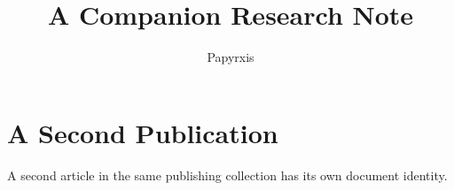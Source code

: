 \documentclass[11pt]{article}
\title{A Companion Research Note}
\author{Papyrxis}
\begin{document}
\maketitle
\section{A Second Publication}
A second article in the same publishing collection has its own document identity.
\end{document}
